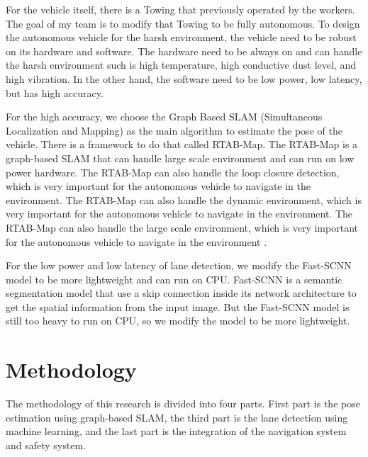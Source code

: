 \documentclass[conference]{IEEEtran}
\begin{document}
\par    
For the vehicle itself, there is a Towing that previously operated by the workers. The goal of my team is to modify that Towing to be fully autonomous. To design the autonomous vehicle for the harsh environment, the vehicle need to be robust on its hardware and software. The hardware need to be always on and can handle the harsh environment such is high temperature, high conductive dust level, and high vibration. In the other hand, the software need to be low power, low latency, but has high accuracy.

\par    
For the high accuracy, we choose the Graph Based SLAM (Simultaneous Localization and Mapping) as the main algorithm to estimate the pose of the vehicle. There is a framework to do that called RTAB-Map. The RTAB-Map is a graph-based SLAM that can handle large scale environment and can run on low power hardware. The RTAB-Map can also handle the loop closure detection, which is very important for the autonomous vehicle to navigate in the environment. The RTAB-Map can also handle the dynamic environment, which is very important for the autonomous vehicle to navigate in the environment. The RTAB-Map can also handle the large scale environment, which is very important for the autonomous vehicle to navigate in the environment \cite{ref_rtabmap}.  

\par    
For the low power and low latency of lane detection, we modify the Fast-SCNN model \cite{ref_fast_scnn} to be more lightweight and can run on CPU. Fast-SCNN is a semantic segmentation model that use a skip connection inside its network architecture to get the spatial information from the input image. But the Fast-SCNN model is still too heavy to run on CPU, so we modify the model to be more lightweight.  


\section{Methodology}
The methodology of this research is divided into four parts. First part is the pose estimation using graph-based SLAM, the third part is the lane detection using machine learning, and the last part is the integration of the navigation system and safety system. 
\end{document}
